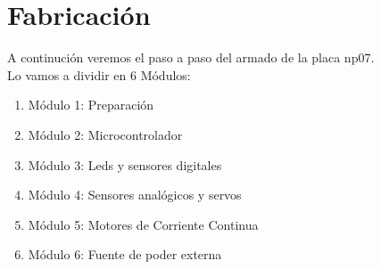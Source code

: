 \chapter{Fabricación}

A continución veremos el paso a paso del armado de la placa np07.
\\

Lo vamos a dividir en 6 Módulos:


\begin{enumerate}
	
	\item Módulo 1: Preparación
	\item Módulo 2: Microcontrolador
	\item Módulo 3: Leds y sensores digitales
	\item Módulo 4: Sensores analógicos y servos
	\item Módulo 5: Motores de Corriente Continua
	\item Módulo 6: Fuente de poder externa

\end{enumerate}

